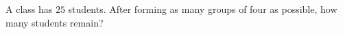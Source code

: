 A class has $25$ students. After forming as many groups of four as possible, how many students remain?
